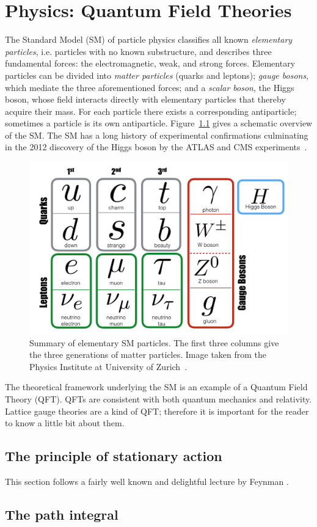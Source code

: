 \chapter{Physics: Quantum Field Theories}

The Standard Model (SM) of particle physics classifies all known
{\it elementary particles}, i.e. particles with no known substructure,
and describes three fundamental forces: the electromagnetic,
weak, and strong forces. Elementary particles can be divided into
{\it matter particles} (quarks and leptons); {\it gauge bosons}, which mediate
the three aforementioned forces; and a {\it scalar boson}, the Higgs boson,
whose field interacts directly with elementary particles that thereby
acquire their mass. For each particle there exists a corresponding
antiparticle; sometimes a particle is its own antiparticle.
Figure~\ref{fig:SM} gives a schematic overview of the SM.
The SM has a long history of experimental confirmations culminating
in the 2012 discovery of the Higgs boson by the ATLAS and CMS
experiments~\cite{aad_observation_2012,chatrchyan_observation_2012}.

\begin{figure}
  \centering
  \includegraphics[width=0.95\linewidth]{figs/SM.png}
  \caption{Summary of elementary SM particles. The first three columns give
           the three generations of matter particles. Image taken
           from the Physics Institute at University of 
           Zurich~\cite{zurich_SM}.}
  \label{fig:SM}
\end{figure}

The theoretical framework underlying the SM is an example of a Quantum 
Field Theory (QFT). QFTs are consistent with both quantum mechanics and
relativity. Lattice gauge theories are a kind of QFT; therefore it is
important for the reader to know a little bit about them.

\section{The principle of stationary action}

This section follows a fairly well known and delightful lecture by Feynman
\cite{caltech}.

\section{The path integral}



